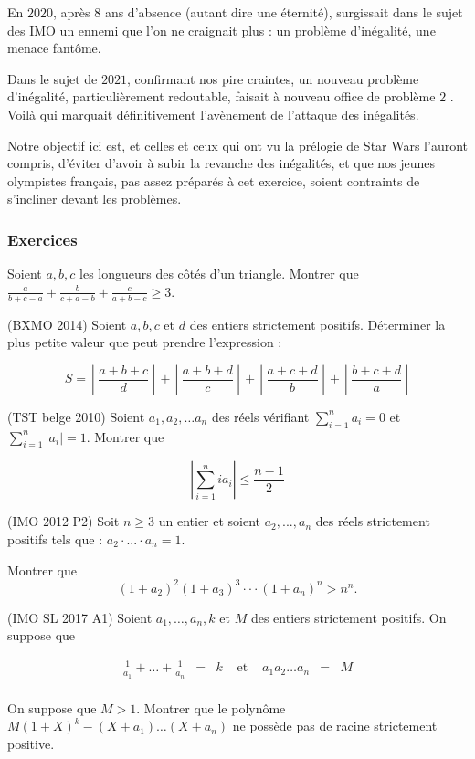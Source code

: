 
En $2020$, après $8$ ans d'absence (autant dire une éternité), surgissait dans le sujet des IMO un ennemi que l'on ne craignait plus : un problème d'inégalité, une menace fantôme.

Dans le sujet de $2021$, confirmant nos pire craintes, un nouveau problème d'inégalité, particulièrement redoutable, faisait à nouveau office de problème $2$ . Voilà qui marquait définitivement l'avènement de l'attaque des inégalités.

Notre objectif ici est, et celles et ceux qui ont vu la prélogie de Star Wars l'auront compris, d'éviter d'avoir à subir la revanche des inégalités, et que nos jeunes olympistes français, pas assez préparés à cet exercice, soient contraints de s'incliner devant les problèmes.

\subsubsection{Exercices}
\begin{exo}
Soient $a,b,c$ les longueurs des côtés d'un triangle. Montrer que $\frac{a}{b+c-a}+\frac{b}{c+a-b}+\frac{c}{a+b-c} \geq 3$.
\end{exo}

\begin{exo}
(BXMO 2014) Soient $a,b,c$ et $d$ des entiers strictement positifs. Déterminer la plus petite valeur que peut prendre l'expression :

\[S=\left\lfloor \frac{a+b+c}{d}\right\rfloor + \left\lfloor \frac{a+b+d}{c}\right\rfloor + \left\lfloor \frac{a+c+d}{b}\right\rfloor +\left\lfloor \frac{b+c+d}{a}\right\rfloor\]
\end{exo}

\begin{exo}
(TST belge 2010)
Soient $a_1,a_2,\ldots a_n$ des réels vérifiant $\sum_{i=1}^{n} a_i=0$ et $\sum_{i=1}^{n} |a_i| =1$. Montrer que

\[\left| \sum_{i=1}^{n} ia_i \right| \leqslant \frac{n-1}2\]
\end{exo}


\begin{exo}
(IMO 2012 P2)
Soit $n \geq 3$ un entier et soient $a_2,...,a_n$ des réels strictement positifs tels que : $a_2 \cdot ... \cdot a_n =1$.

Montrer que
\[
(1+a_2)^2(1+a_3)^3 \cdot \cdot \cdot (1+a_n)^n > n^n.
\]
\end{exo}

\begin{exo}
(IMO SL 2017 A1)
Soient $a_1, \ldots, a_n, k$ et $M$ des entiers strictement positifs. On suppose que

\[\begin{array}{lllllll}
\frac1{a_1}+ \ldots + \frac1{a_n} &=& k &\text{ et }& a_1 a_2 \ldots a_n &=& M\\
\end{array}\]

On suppose que $M>1$. Montrer que le polynôme $M(1+X)^k-(X+a_1) \ldots (X+a_n)$ ne possède pas de racine strictement positive.
\end{exo}

